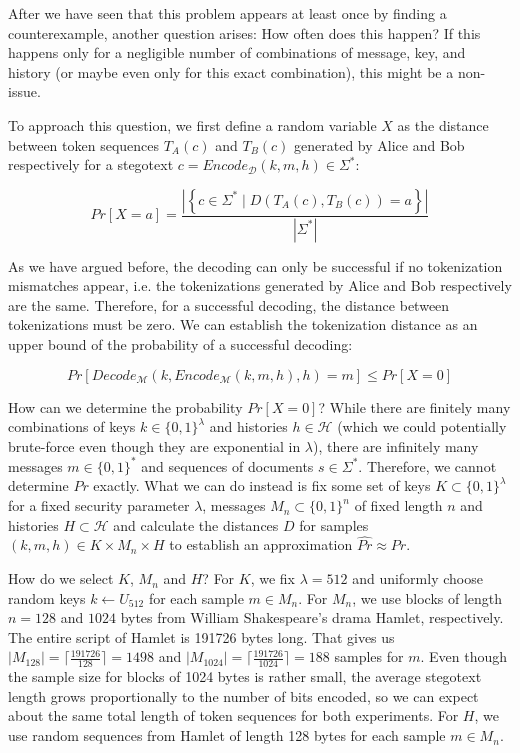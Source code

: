 After we have seen that this problem appears at least once by finding a counterexample, another question arises:
How often does this happen?
If this happens only for a negligible number of combinations of message, key, and history (or maybe even only for this exact combination), this might be a non-issue.

To approach this question, we first define a random variable $X$ as the distance between token sequences $T_A(c)$ and $T_B(c)$ generated by Alice and Bob respectively for a stegotext $c = Encode_{\mathcal{D}}(k,m,h) \in \Sigma^*$:


$$Pr[X=a] = \frac{\left| \left\{ c \in \Sigma^* \mid D(T_A(c), T_B(c)) = a \right\} \right|}{\left| \Sigma^* \right|}$$

As we have argued before, the decoding can only be successful if no tokenization mismatches appear, i.e. the tokenizations generated by Alice and Bob respectively are the same.
Therefore, for a successful decoding, the distance between tokenizations must be zero.
We can establish the tokenization distance as an upper bound of the probability of a successful decoding:

$$Pr[Decode_{\mathcal{M}}(k, Encode_{\mathcal{M}}(k,m,h), h)=m] \leq Pr[X=0]$$

How can we determine the probability $Pr[X=0]$?
While there are finitely many combinations of keys $k \in \{0,1\}^\lambda$ and histories $h \in \mathcal{H}$ (which we could potentially brute-force even though they are exponential in $\lambda$), there are infinitely many messages $m \in \{0,1\}^*$ and sequences of documents $s \in \Sigma^*$.
Therefore, we cannot determine $Pr$ exactly.
What we can do instead is fix some set of keys $K \subset \{0,1\}^\lambda$ for a fixed security parameter $\lambda$, messages $M_n \subset \{0,1\}^n$ of fixed length $n$ and histories $H \subset \mathcal{H}$ and calculate the distances $D$ for samples $(k,m,h) \in K \times M_n \times H$ to establish an approximation $\hat{Pr} \approx Pr$.

How do we select $K$, $M_n$ and $H$?
For $K$, we fix $\lambda = 512$ and uniformly choose random keys $k \leftarrow U_{512}$ for each sample $m \in M_n$.
For $M_n$, we use blocks of length $n=128$ and $1024$ bytes from William Shakespeare's drama Hamlet, respectively.
The entire script of Hamlet is 191726 bytes long.
That gives us $|M_{128}|=\lceil \frac{191726}{128} \rceil = 1498$ and $|M_{1024}|= \lceil \frac{191726}{1024} \rceil = 188$ samples for $m$.
Even though the sample size for blocks of 1024 bytes is rather small, the average stegotext length grows proportionally to the number of bits encoded, so we can expect about the same total length of token sequences for both experiments.
For $H$, we use random sequences from Hamlet of length 128 bytes for each sample $m \in M_n$.

